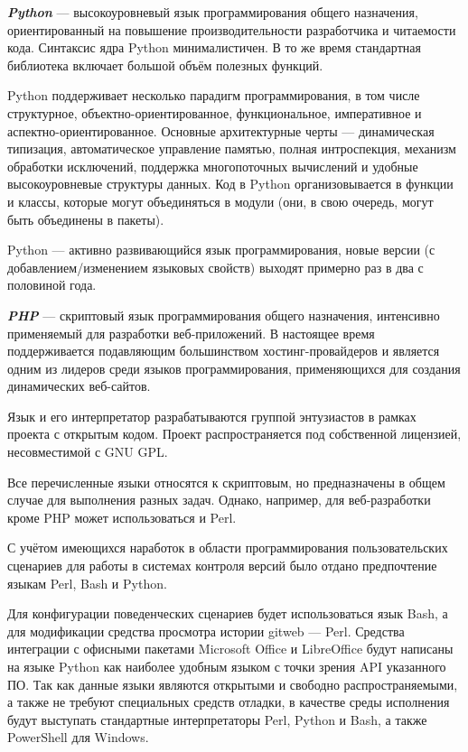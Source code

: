\vspace{\baselineskip}
\textbf{\textit{Python}} ---  высокоуровневый язык программирования общего назначения, ориентированный на повышение производительности разработчика и читаемости кода. Синтаксис ядра Python минималистичен. В то же время стандартная библиотека включает большой объём полезных функций.

Python поддерживает несколько парадигм программирования, в том числе структурное, объектно-ориентированное, функциональное, императивное и аспектно-ориентированное. Основные архитектурные черты --- динамическая типизация, автоматическое управление памятью, полная интроспекция, механизм обработки исключений, поддержка многопоточных вычислений и удобные высокоуровневые структуры данных. Код в Python организовывается в функции и классы, которые могут объединяться в модули (они, в свою очередь, могут быть объединены в пакеты).

Python --- активно развивающийся язык программирования, новые версии (с добавлением/изменением языковых свойств) выходят примерно раз в два с половиной года.

\vspace{\baselineskip}
\textbf{\textit{PHP}} ---  скриптовый язык программирования общего назначения, интенсивно применяемый для разработки веб-приложений. В настоящее время поддерживается подавляющим большинством хостинг-провайдеров и является одним из лидеров среди языков программирования, применяющихся для создания динамических веб-сайтов.

Язык и его интерпретатор разрабатываются группой энтузиастов в рамках проекта с открытым кодом. Проект распространяется под собственной лицензией, несовместимой с GNU GPL.

\vspace{\baselineskip}
Все перечисленные языки относятся к скриптовым, но предназначены в общем случае для выполнения разных задач. Однако, например, для веб-разработки кроме PHP может использоваться и Perl.

\vspace{\baselineskip}
С учётом имеющихся наработок в области программирования пользовательских сценариев для работы в системах контроля версий было отдано предпочтение языкам Perl, Bash и Python.

\vspace{\baselineskip}
Для конфигурации поведенческих сценариев будет использоваться язык Bash, а для модификации средства просмотра истории gitweb --- Perl. Средства интеграции с офисными пакетами Microsoft Office и LibreOffice будут написаны на языке Python как наиболее удобным языком с точки зрения API указанного ПО. Так как данные языки являются открытыми и свободно распространяемыми, а также не требуют специальных средств отладки, в качестве среды исполнения будут выступать стандартные интерпретаторы Perl, Python и Bash, а также PowerShell для Windows.